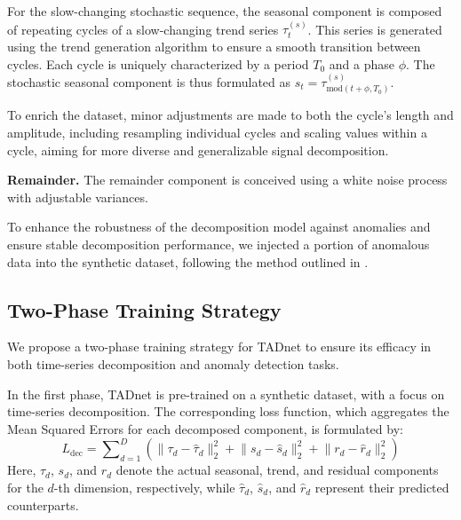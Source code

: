 \documentclass{article}
\begin{document}
For the slow-changing stochastic sequence, the seasonal component is composed of repeating cycles of a slow-changing trend series \( \tau^{(s)}_t \). This series is generated using the trend generation algorithm to ensure a smooth transition between cycles. Each cycle is uniquely characterized by a period \( T_0 \) and a phase \( \phi \). The stochastic seasonal component is thus formulated as \( s_t = \tau^{(s)}_{\text{mod}(t + \phi, T_0)} \).

To enrich the dataset, minor adjustments are made to both the cycle's length and amplitude, including resampling individual cycles and scaling values within a cycle, aiming for more diverse and generalizable signal decomposition.

\textbf{Remainder.}
The remainder component is conceived using a white noise process with adjustable variances.

To enhance the robustness of the decomposition model against anomalies and ensure stable decomposition performance, we injected a portion of anomalous data into the synthetic dataset, following the method outlined in \cite{lai2021revisiting}.

\subsection{Two-Phase Training Strategy}
We propose a two-phase training strategy for TADnet to ensure its efficacy in both time-series decomposition and anomaly detection tasks.

In the first phase, TADnet is pre-trained on a synthetic dataset, with a focus on time-series decomposition. The corresponding loss function, which aggregates the Mean Squared Errors for each decomposed component, is formulated by:
\begin{equation}
    L_{\text{dec}} = \sum\nolimits_{d=1}^{D} \left( \lVert \tau_d-\hat\tau_d \rVert_2^2 + \lVert s_d-\hat s_d \rVert_2^2 + \lVert r_d-\hat r_d \rVert_2^2 \right)
\end{equation}
Here, \( \tau_d \), \( s_d \), and \( r_d \) denote the actual seasonal, trend, and residual components for the \( d \)-th dimension, respectively, while \( \hat{\tau}_d \), \( \hat{s}_d \), and \( \hat{r}_d \) represent their predicted counterparts.
\end{document}
